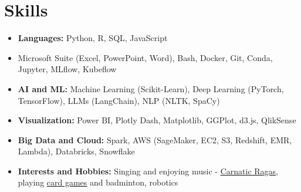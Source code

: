 \documentclass[letterpaper,11pt]{article}
\begin{document}
\section{\Large{Skills}}
\vspace{3pt}
\begin{itemize}[leftmargin=0.00in, label={}, itemsep=0pt, parsep=0pt]
    \item{
        \small{\textbf{Languages:}}
        \small{Python, R, SQL, JavaScript} 
        \hspace{0.7cm}
        }

        \item{
        {\fontsize{10.2pt}{13pt}\selectfont{Tools:}}
        \small{Microsoft Suite (Excel, PowerPoint, Word), Bash, Docker, Git, Conda, Jupyter, MLflow, Kubeflow}
        }




    \item{
        \small{\textbf{AI and ML:}}
        \small{Machine Learning (Scikit-Learn), Deep Learning (PyTorch, TensorFlow), LLMs (LangChain), NLP (NLTK, SpaCy)}
        }

    \item{
        \small{\textbf{Visualization:}}
        \small{Power BI, Plotly Dash, Matplotlib, GGPlot, d3.js, QlikSense}
        }
        
    \item{
        \small{\textbf{Big Data and Cloud:}}
        \small{Spark, AWS (SageMaker, EC2, S3, Redshift, EMR, Lambda), Databricks, Snowflake}
        }

    
    \item{
    \small{\textbf{Interests and Hobbies:}}
    \small{Singing and enjoying music - \href{https://vishuragams.pages.dev}{\underline{Carnatic Ragas}}, playing \href{https://vishugp.github.io/Thuruppu/}{\underline{card games}} and badminton, robotics}
    }
\end{itemize}
\end{document}
